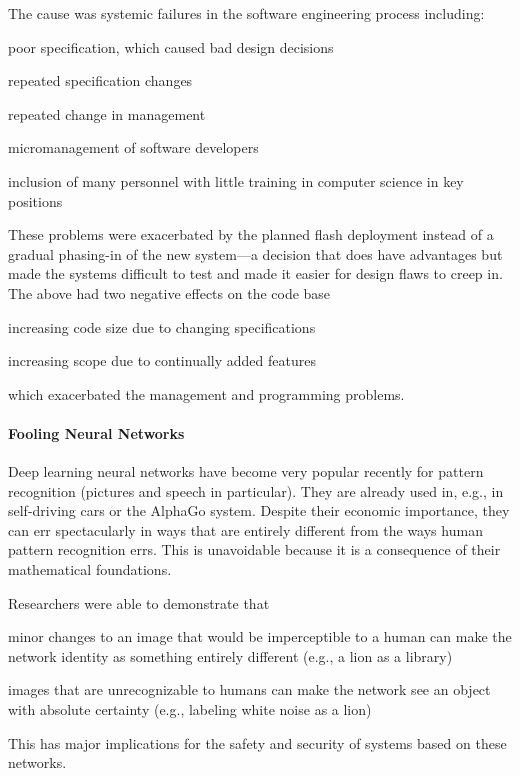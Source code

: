 The cause was systemic failures in the software engineering process including:
\begin{compactitem}
 \item poor specification, which caused bad design decisions
 \item repeated specification changes
 \item repeated change in management
 \item micromanagement of software developers
 \item inclusion of many personnel with little training in computer science in key positions
\end{compactitem}
These problems were exacerbated by the planned flash deployment instead of a gradual phasing-in of the new system---a decision that does have advantages but made the systems difficult to test and made it easier for design flaws to creep in.
The above had two negative effects on the code base
\begin{compactitem}
 \item increasing code size due to changing specifications
 \item increasing scope due to continually added features
\end{compactitem}
which exacerbated the management and programming problems.

\paragraph{Fooling Neural Networks}
Deep learning neural networks have become very popular recently for pattern recognition (pictures and speech in particular).
They are already used in, e.g., in self-driving cars or the AlphaGo system.
Despite their economic importance, they can err spectacularly in ways that are entirely different from the ways human pattern recognition errs.
This is unavoidable because it is a consequence of their mathematical foundations.

Researchers were able to demonstrate that
\begin{compactitem}
 \item minor changes to an image that would be imperceptible to a human can make the network identity as something entirely different (e.g., a lion as a library)
 \item images that are unrecognizable to humans can make the network see an object with absolute certainty (e.g., labeling white noise as a lion)
\end{compactitem}
This has major implications for the safety and security of systems based on these networks.

